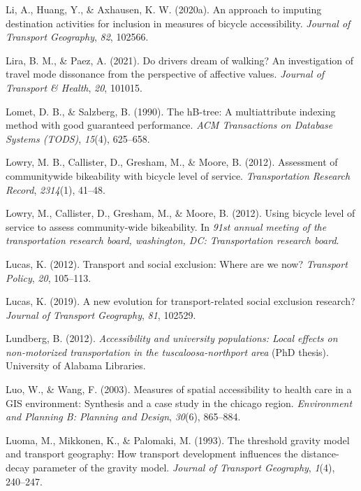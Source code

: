 \documentclass[
11pt, %
oneside, %
english, %
singlespacing, %
]{macthesis} %
\newlength{\cslhangindent}
\newenvironment{CSLReferences}[2] %
{\begin{list}{}{%
	\setlength{\itemindent}{0pt}
	\setlength{\leftmargin}{0pt}
	\setlength{\parsep}{0pt}
	\ifodd #1
	\setlength{\leftmargin}{\cslhangindent}
	\setlength{\itemindent}{-1\cslhangindent}
	\fi
	\setlength{\itemsep}{#2\baselineskip}}}
{\end{list}}
\begin{document}
\begin{CSLReferences}{1}{0}
Li, A., Huang, Y., \& Axhausen, K. W. (2020a). An approach to imputing destination activities for inclusion in measures of bicycle accessibility. \emph{Journal of Transport Geography}, \emph{82}, 102566.

Lira, B. M., \& Paez, A. (2021). Do drivers dream of walking? An investigation of travel mode dissonance from the perspective of affective values. \emph{Journal of Transport \& Health}, \emph{20}, 101015.

Lomet, D. B., \& Salzberg, B. (1990). The hB-tree: A multiattribute indexing method with good guaranteed performance. \emph{ACM Transactions on Database Systems (TODS)}, \emph{15}(4), 625--658.

Lowry, M. B., Callister, D., Gresham, M., \& Moore, B. (2012). Assessment of communitywide bikeability with bicycle level of service. \emph{Transportation Research Record}, \emph{2314}(1), 41--48.

Lowry, M., Callister, D., Gresham, M., \& Moore, B. (2012). Using bicycle level of service to assess community-wide bikeability. In \emph{91st annual meeting of the transportation research board, washington, DC: Transportation research board}.

Lucas, K. (2012). Transport and social exclusion: Where are we now? \emph{Transport Policy}, \emph{20}, 105--113.

Lucas, K. (2019). A new evolution for transport-related social exclusion research? \emph{Journal of Transport Geography}, \emph{81}, 102529.

Lundberg, B. (2012). \emph{Accessibility and university populations: Local effects on non-motorized transportation in the tuscaloosa-northport area} (PhD thesis). University of Alabama Libraries.

Luo, W., \& Wang, F. (2003). Measures of spatial accessibility to health care in a GIS environment: Synthesis and a case study in the chicago region. \emph{Environment and Planning B: Planning and Design}, \emph{30}(6), 865--884.

Luoma, M., Mikkonen, K., \& Palomaki, M. (1993). The threshold gravity model and transport geography: How transport development influences the distance-decay parameter of the gravity model. \emph{Journal of Transport Geography}, \emph{1}(4), 240--247.


\end{CSLReferences}
\end{document}
